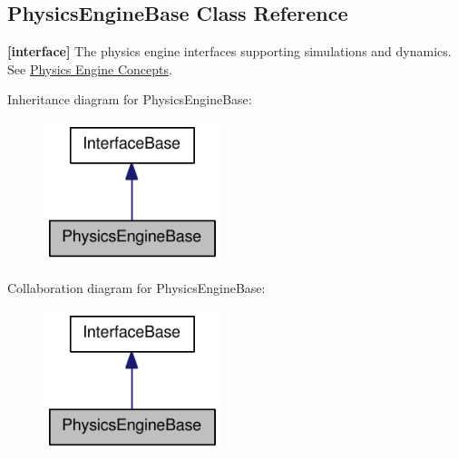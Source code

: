 \hypertarget{classOpenRAVE_1_1PhysicsEngineBase}{
\subsection{PhysicsEngineBase Class Reference}
\label{classOpenRAVE_1_1PhysicsEngineBase}
}


{\bfseries \mbox{[}interface\mbox{]}} The physics engine interfaces supporting simulations and dynamics. See \hyperlink{arch__physicsengine}{Physics Engine Concepts}.  




Inheritance diagram for PhysicsEngineBase:\nopagebreak
\begin{figure}[H]
\begin{center}
\leavevmode
\includegraphics[width=146pt]{classOpenRAVE_1_1PhysicsEngineBase__inherit__graph}
\end{center}
\end{figure}


Collaboration diagram for PhysicsEngineBase:\nopagebreak
\begin{figure}[H]
\begin{center}
\leavevmode
\includegraphics[width=146pt]{classOpenRAVE_1_1PhysicsEngineBase__coll__graph}
\end{center}
\end{figure}
